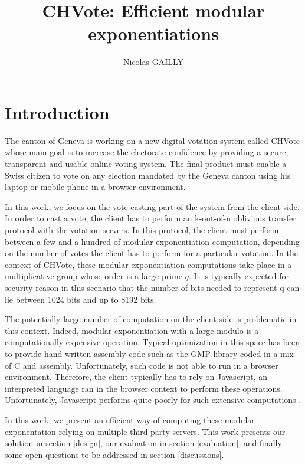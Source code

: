 \documentclass[]{article}
\title{CHVote: Efficient modular exponentiations}
\author{Nicolas GAILLY}
\begin{document}
\maketitle

\section{Introduction} \label{intro}

The canton of Geneva is working on a new digital votation system called
CHVote \cite{chvote} whose main goal is to increase the electorate confidence 
by providing a secure, transparent and usable online voting system. The final
product must enable a Swiss citizen to vote on any election mandated by the
Geneva canton using his laptop or mobile phone in a browser environment.

In this work, we focus on the vote casting part of the system from the client
side. In order to cast a vote, the client has to perform an k-out-of-n oblivious
transfer protocol \cite{chu2005} with the votation servers. In this protocol,
the client must perform between a few and a hundred of modular exponentiation
computation, depending on the number of votes the client has to perform for a
particular votation. In the context of CHVote, these modular exponentiation
computations take place in a multiplicative group whose order is a large prime
$q$. It is typically expected for security reason in this scenario that the number
of bits needed to represent q can lie between 1024 bits and up to 8192 bits.

The potentially large number of computation on the client side is problematic in
this context.  Indeed, modular exponentiation with a large modulo is a
computationally expensive operation. Typical optimization in this space has been
to provide hand written assembly code such as the GMP library \cite{gmplib}
coded in a mix of C and assembly. Unfortunately, such code is not able to run in
a browser environment. Therefore, the client typically has to rely on
Javascript, an interpreted language ran in the browser context to perform these
operations.  Unfortunately, Javascript performs quite poorly for such extensive
computations \cite{jsbad}.

In this work, we present an efficient way of computing these modular
exponentation relying on multiple third party servers. This work presents our solution
in section \ref{design}, our evaluation in section \ref{evaluation}, and finally some open
questions to be addressed in section \ref{discussions}.
\end{document}
